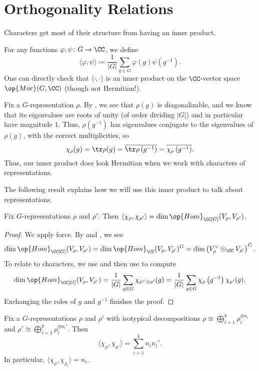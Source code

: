 \documentclass[../main.tex]{subfiles}
\begin{document}
\section{Orthogonality Relations}
Characters get most of their structure from having an inner product.
\begin{notation}
	For any functions $\varphi,\psi\colon G\to\CC$, we define
	\[\langle\varphi,\psi\rangle\coloneqq\frac1{|G|}\sum_{g\in G}\varphi(g)\psi\left(g^{-1}\right).\]
	One can directly check that $\langle\cdot,\cdot\rangle$ is an inner product on the $\CC$-vector space $\op{Mor}(G,\CC)$ (though not Hermitian!).
\end{notation}
\begin{remark} \label{rem:conj-char}
	Fix a $G$-representation $\rho$. By , we see that $\rho(g)$ is diagonalizable, and we know that its eigenvalues are roots of unity (of order dividing $|G|$) and in particular have magnitude $1$. Thus, $\rho\left(g^{-1}\right)$ has eigenvalues conjugate to the eigenvalues of $\rho(g)$, with the correct multiplicities, so
	\[\chi_\rho(g)=\tr\rho(g)=\overline{\tr\rho\left(g^{-1}\right)}=\overline{\chi_\rho\left(g^{-1}\right)}.\]
	Thus, our inner product does look Hermitian when we work with characters of representations.
\end{remark}
The following result explains how we will use this inner product to talk about representations.
\begin{theorem} \label{thm:ortho-relations}
	Fix $G$-representations $\rho$ and $\rho'$. Then $\langle\chi_\rho,\chi_{\rho'}\rangle=\dim\op{Hom}_{\CC[G]}(V_\rho,V_{\rho'})$.
\end{theorem}
\begin{proof}
	We apply force. By  and , we see
	\[\dim\op{Hom}_{\CC[G]}(V_\rho,V_{\rho'})=\dim\op{Hom}_\CC(V_\rho,V_{\rho'})^G=\dim\left(V_\rho^\lor\otimes_\CC V_{\rho'}\right)^G.\]
	To relate to characters, we use  and then use  to compute
	\[\dim\op{Hom}_{\CC[G]}(V_\rho,V_{\rho'})=\frac1{|G|}\sum_{g\in G}\chi_{\rho^\lor\otimes\rho'}(g)=\frac1{|G|}\sum_{g\in G}\chi_{\rho}\left(g^{-1}\right)\chi_{\rho'}(g).\]
	Exchanging the roles of $g$ and $g^{-1}$ finishes the proof.
\end{proof}
\begin{corollary} \label{cor:inner-product-isotypical}
	Fix a $G$-representations $\rho$ and $\rho'$ with isotypical decompositions $\rho\cong\bigoplus_{i=1}^k\rho_i^{\oplus n_i}$ and $\rho'\cong\bigoplus_{i=1}^k\rho_i^{\oplus n_i'}$. Then
	\[\langle\chi_\rho,\chi_{\rho'}\rangle=\sum_{i=1}^kn_in_i'.\]
	In particular, $\langle\chi_\rho,\chi_{\rho_i}\rangle=n_i$.
\end{corollary}
\end{document}
